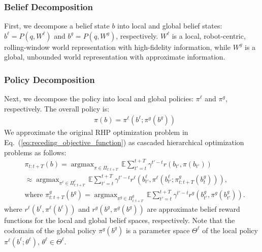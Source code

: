\documentclass[letterpaper]{article} %
\newcommand{\ph}[1]{{\textbf{#1}:}} %
\newcommand{\argmax}{\mathop{\mathrm{argmax}}}
\begin{document}
\subsubsection{Belief Decomposition} \hfill

\noindent
First, we decompose a belief state $b$ into local and global belief states: $b^\ell = P(q, W^\ell)$ and $b^g = P(q, W^g)$, respectively.
$W^\ell$ is a local, robot-centric, rolling-window world representation with high-fidelity information, while $W^g$ is a global, unbounded world representation with approximate information.

\subsubsection{Policy Decomposition} \hfill

\noindent
Next, we decompose the policy into local and global policies: $\pi^\ell$ and $\pi^g$, respectively. The overall policy is:
\begin{align}
  &\pi(b) = \pi^\ell(b^\ell; \pi^g(b^g))
\end{align}
%
We approximate the original RHP optimization problem in Eq.~(\ref{eq:receding_objective_function}) as cascaded hierarchical optimization problems as follows:
\begin{align}
  &\pi_{t:t+T}(b)
  = \argmax_{\pi \in \Pi_{t:t+T}} \, \mathbb{E} \sum_{t'=t}^{t+T} \gamma^{t'-t} r(b_{t'}, \pi(b_{t'}))
  \nonumber \\
  & \approx \argmax_{\pi^\ell \in \Pi^\ell_{t:t+T}} \, \mathbb{E} \sum_{t'=t}^{t+T} \gamma^{t'-t} r^\ell(b^\ell_{t'}, \pi^\ell(b^\ell_{t'}; \pi_{t:t+T}^g(b^g_t))),
  \label{eq:llp_optimization}
  \\
  &\text{where }
  \pi_{t:t+T}^g(b^g) = \argmax_{\pi^g \in \Pi^g_{t:t+T}} \, \mathbb{E} \sum_{t'=t}^{t+T} \gamma^{t'-t} r^g(b^g_{t'}, \pi^g(b^g_{t'})).
  \label{eq:glp_optimization}
\end{align}
\normalsize
where $r^\ell(b^\ell, \pi^\ell(b^\ell))$ and $r^g(b^g, \pi^g(b^g))$ are approximate belief reward functions for the local and global belief spaces, respectively.
%
Note that the codomain of the global policy $\pi^g(b^g)$ is a parameter space $\Theta^\ell$ of the local policy $\pi^\ell(b^\ell; \theta^\ell)$, $\theta^\ell \!\! \in \! \Theta^\ell\!$.\,
\end{document}
